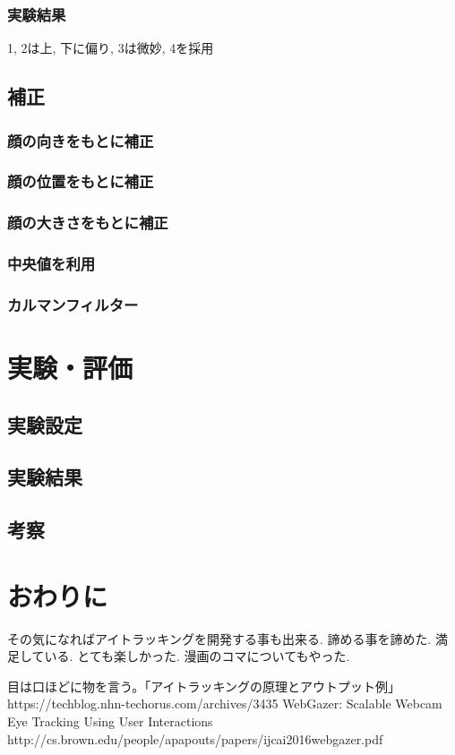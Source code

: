 \documentclass[a4paper,11pt]{jsarticle}
\begin{document}
\subsubsection{実験結果}
1, 2は上, 下に偏り, 3は微妙, 4を採用

\subsection{補正}
\subsubsection{顔の向きをもとに補正}
\subsubsection{顔の位置をもとに補正}
\subsubsection{顔の大きさをもとに補正}
\subsubsection{中央値を利用}
\subsubsection{カルマンフィルター}

\section{実験・評価}
\subsection{実験設定}
\subsection{実験結果}
\subsection{考察}

\section{おわりに}
その気になればアイトラッキングを開発する事も出来る.
諦める事を諦めた. 満足している. とても楽しかった.
漫画のコマについてもやった.

\begin{thebibliography}{}
   目は口ほどに物を言う。「アイトラッキングの原理とアウトプット例」 https://techblog.nhn-techorus.com/archives/3435
   WebGazer: Scalable Webcam Eye Tracking Using User Interactions http://cs.brown.edu/people/apapouts/papers/ijcai2016webgazer.pdf
\end{thebibliography}
\end{document}
